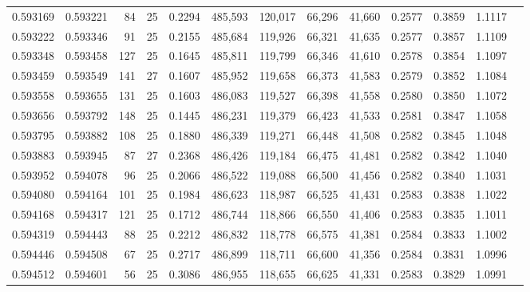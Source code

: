 \begin{tabular}{rrrrrrrrrrrrr}
0.593169 & 0.593221 &  84 &  25 &                                     0.2294 & 485,593 & 120,017 &  66,296 &  41,660 & 0.2577 & 0.3859 & 1.1117 \\
0.593222 & 0.593346 &  91 &  25 &                                     0.2155 & 485,684 & 119,926 &  66,321 &  41,635 & 0.2577 & 0.3857 & 1.1109 \\
0.593348 & 0.593458 & 127 &  25 &                                     0.1645 & 485,811 & 119,799 &  66,346 &  41,610 & 0.2578 & 0.3854 & 1.1097 \\
0.593459 & 0.593549 & 141 &  27 &                                     0.1607 & 485,952 & 119,658 &  66,373 &  41,583 & 0.2579 & 0.3852 & 1.1084 \\
0.593558 & 0.593655 & 131 &  25 &                                     0.1603 & 486,083 & 119,527 &  66,398 &  41,558 & 0.2580 & 0.3850 & 1.1072 \\
0.593656 & 0.593792 & 148 &  25 &                                     0.1445 & 486,231 & 119,379 &  66,423 &  41,533 & 0.2581 & 0.3847 & 1.1058 \\
0.593795 & 0.593882 & 108 &  25 &                                     0.1880 & 486,339 & 119,271 &  66,448 &  41,508 & 0.2582 & 0.3845 & 1.1048 \\
0.593883 & 0.593945 &  87 &  27 &                                     0.2368 & 486,426 & 119,184 &  66,475 &  41,481 & 0.2582 & 0.3842 & 1.1040 \\
0.593952 & 0.594078 &  96 &  25 &                                     0.2066 & 486,522 & 119,088 &  66,500 &  41,456 & 0.2582 & 0.3840 & 1.1031 \\
0.594080 & 0.594164 & 101 &  25 &                                     0.1984 & 486,623 & 118,987 &  66,525 &  41,431 & 0.2583 & 0.3838 & 1.1022 \\
0.594168 & 0.594317 & 121 &  25 &                                     0.1712 & 486,744 & 118,866 &  66,550 &  41,406 & 0.2583 & 0.3835 & 1.1011 \\
0.594319 & 0.594443 &  88 &  25 &                                     0.2212 & 486,832 & 118,778 &  66,575 &  41,381 & 0.2584 & 0.3833 & 1.1002 \\
0.594446 & 0.594508 &  67 &  25 &                                     0.2717 & 486,899 & 118,711 &  66,600 &  41,356 & 0.2584 & 0.3831 & 1.0996 \\
0.594512 & 0.594601 &  56 &  25 &                                     0.3086 & 486,955 & 118,655 &  66,625 &  41,331 & 0.2583 & 0.3829 & 1.0991 \\

\end{tabular}
